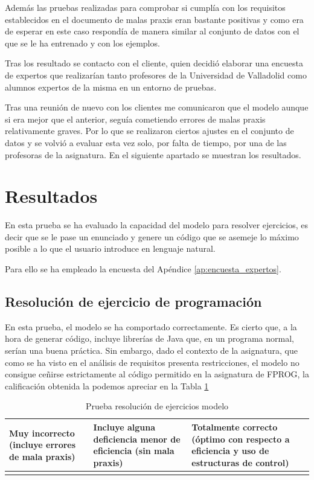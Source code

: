 Además las pruebas realizadas para comprobar si cumplía con los requisitos establecidos en el documento de malas praxis eran bastante positivas y como era de esperar en este caso respondía de manera similar al conjunto de datos con el que se le ha entrenado y con los ejemplos.

Tras los resultado se contacto con el cliente, quien decidió elaborar una encuesta de expertos que realizarían tanto profesores de la Universidad de Valladolid como alumnos expertos de la misma en un entorno de pruebas.

Tras una reunión de nuevo con los clientes me comunicaron que el modelo aunque si era mejor que el anterior, seguía cometiendo errores de malas praxis relativamente graves. Por lo que se realizaron ciertos ajustes en el conjunto de datos y se volvió a evaluar esta vez solo, por falta de tiempo, por una de las profesoras de la asignatura. En el siguiente apartado se muestran los resultados.

\section{Resultados}

En esta prueba se ha evaluado la capacidad del modelo para resolver ejercicios, es decir que se le pase un enunciado y genere un código que se asemeje lo máximo posible a lo que el usuario introduce en lenguaje natural.

Para ello se ha empleado la encuesta del Apéndice \ref{ap:encuesta_expertos}.

\subsection{Resolución de ejercicio de programación}
En esta prueba, el modelo se ha comportado correctamente. Es cierto que, a la hora de generar código, incluye librerías de Java que, en un programa normal, serían una buena práctica. Sin embargo, dado el contexto de la asignatura, que como se ha visto en el análisis de requisitos presenta restricciones, el modelo no consigue ceñirse estrictamente al código permitido en la asignatura de FPROG, la calificación obtenida la podemos apreciar en la Tabla \ref{tabla:evaluacion-ej1}

\begin{table}[htb]
    \centering
    \begin{tabular}{| >{\arraybackslash}m{}| >{\arraybackslash}m{} | >{\arraybackslash}m{}|} \hline
    \vspace{0.5em}  Muy incorrecto (incluye errores de mala praxis) \vspace{0.5em} &  Incluye alguna deficiencia menor de eficiencia (sin mala praxis) & Totalmente correcto (óptimo con respecto a eficiencia y uso de estructuras de control) \\ \hline
     & \multicolumn{1}{|c|}{X} & \\ \hline 
    \end{tabular}\caption{Prueba resolución de ejercicios modelo}
    \label{tabla:evaluacion-ej1}
\end{table}


